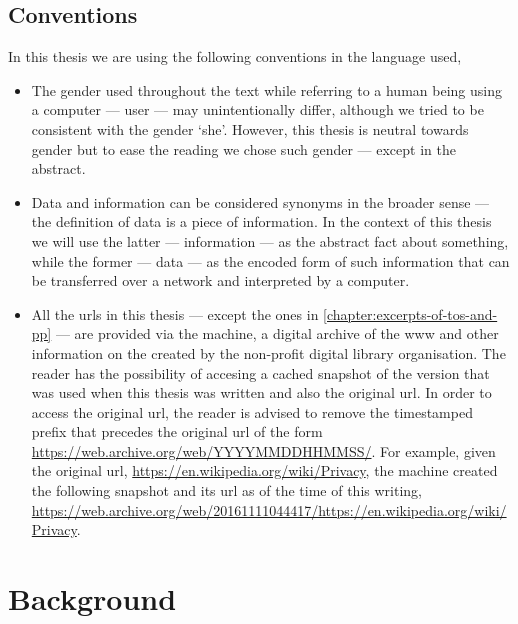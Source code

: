 \documentclass[showtrims, oldfontcommands]{kthesis}
\begin{document}
\section{Conventions}
    \label{section:conventions}
In this thesis we are using the following conventions in the language used,
\begin{itemize}
    \item The gender used throughout the text while referring to a human being using 
    a computer --- user --- may unintentionally differ, although we tried to be 
    consistent with the gender `she'. However, this thesis is neutral towards gender 
    but to ease the reading we chose such gender --- except in the abstract.

    \item Data and information can be considered synonyms in the broader sense --- 
    the definition of data is a piece of information. In the context of this thesis 
    we will use the latter --- information --- as the abstract fact about something, 
    while the former --- data --- as the encoded form of such information that can 
    be transferred over a network and interpreted by a computer.
    
    \item All the \acp{url} in this thesis --- except the ones in \cref{chapter:excerpts-of-tos-and-pp} ---
    are provided via the \Wayback machine, a digital archive of the \ac{www} and 
    other information on the \Internet created by the \InternetArchive non-profit 
    digital library organisation. The reader has the possibility of accesing a cached 
    snapshot of the version that was used when this thesis was written and also 
    the original \ac{url}. In order to access the original \ac{url}, the reader 
    is advised to remove the timestamped prefix that precedes the original \ac{url} 
    of the form \url{https://web.archive.org/web/YYYYMMDDHHMMSS/}. For example, 
    given the original \ac{url}, \url{https://en.wikipedia.org/wiki/Privacy}, the 
    \Wayback machine created the following snapshot and its \ac{url} as of the time 
    of this writing, \url{https://web.archive.org/web/20161111044417/https://en.wikipedia.org/wiki/Privacy}.
\end{itemize}


\chapter{Background}
    \label{chapter:background}
\end{document}
